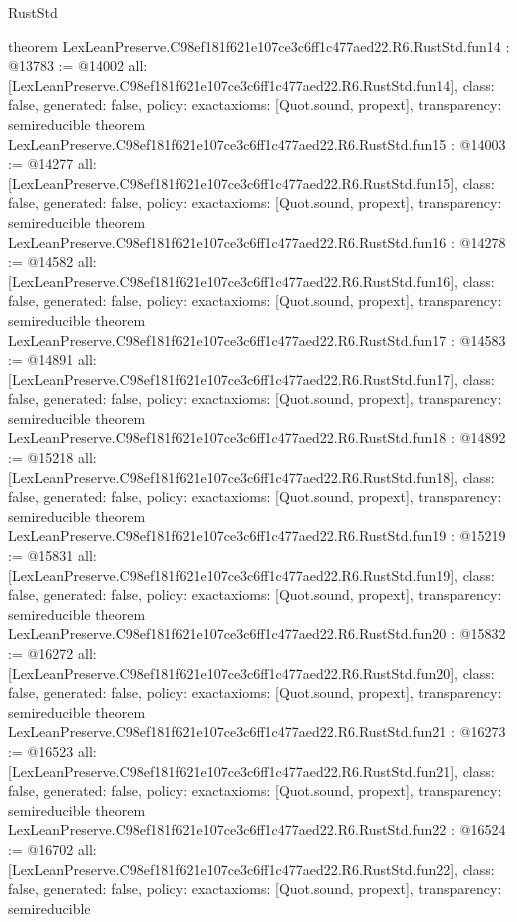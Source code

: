\begin{lexlean}{RustStd}
\begin{coremodule}
{}
theorem LexLeanPreserve.C98ef181f621e107ce3c6ff1c477aed22.R6.RustStd.fun14 : @13783 := @14002 {
  all: [LexLeanPreserve.C98ef181f621e107ce3c6ff1c477aed22.R6.RustStd.fun14],
  class: false,
  generated: false,
  policy: exact{axioms: [Quot.sound, propext]},
  transparency: semireducible
}
theorem LexLeanPreserve.C98ef181f621e107ce3c6ff1c477aed22.R6.RustStd.fun15 : @14003 := @14277 {
  all: [LexLeanPreserve.C98ef181f621e107ce3c6ff1c477aed22.R6.RustStd.fun15],
  class: false,
  generated: false,
  policy: exact{axioms: [Quot.sound, propext]},
  transparency: semireducible
}
theorem LexLeanPreserve.C98ef181f621e107ce3c6ff1c477aed22.R6.RustStd.fun16 : @14278 := @14582 {
  all: [LexLeanPreserve.C98ef181f621e107ce3c6ff1c477aed22.R6.RustStd.fun16],
  class: false,
  generated: false,
  policy: exact{axioms: [Quot.sound, propext]},
  transparency: semireducible
}
theorem LexLeanPreserve.C98ef181f621e107ce3c6ff1c477aed22.R6.RustStd.fun17 : @14583 := @14891 {
  all: [LexLeanPreserve.C98ef181f621e107ce3c6ff1c477aed22.R6.RustStd.fun17],
  class: false,
  generated: false,
  policy: exact{axioms: [Quot.sound, propext]},
  transparency: semireducible
}
theorem LexLeanPreserve.C98ef181f621e107ce3c6ff1c477aed22.R6.RustStd.fun18 : @14892 := @15218 {
  all: [LexLeanPreserve.C98ef181f621e107ce3c6ff1c477aed22.R6.RustStd.fun18],
  class: false,
  generated: false,
  policy: exact{axioms: [Quot.sound, propext]},
  transparency: semireducible
}
theorem LexLeanPreserve.C98ef181f621e107ce3c6ff1c477aed22.R6.RustStd.fun19 : @15219 := @15831 {
  all: [LexLeanPreserve.C98ef181f621e107ce3c6ff1c477aed22.R6.RustStd.fun19],
  class: false,
  generated: false,
  policy: exact{axioms: [Quot.sound, propext]},
  transparency: semireducible
}
theorem LexLeanPreserve.C98ef181f621e107ce3c6ff1c477aed22.R6.RustStd.fun20 : @15832 := @16272 {
  all: [LexLeanPreserve.C98ef181f621e107ce3c6ff1c477aed22.R6.RustStd.fun20],
  class: false,
  generated: false,
  policy: exact{axioms: [Quot.sound, propext]},
  transparency: semireducible
}
theorem LexLeanPreserve.C98ef181f621e107ce3c6ff1c477aed22.R6.RustStd.fun21 : @16273 := @16523 {
  all: [LexLeanPreserve.C98ef181f621e107ce3c6ff1c477aed22.R6.RustStd.fun21],
  class: false,
  generated: false,
  policy: exact{axioms: [Quot.sound, propext]},
  transparency: semireducible
}
theorem LexLeanPreserve.C98ef181f621e107ce3c6ff1c477aed22.R6.RustStd.fun22 : @16524 := @16702 {
  all: [LexLeanPreserve.C98ef181f621e107ce3c6ff1c477aed22.R6.RustStd.fun22],
  class: false,
  generated: false,
  policy: exact{axioms: [Quot.sound, propext]},
  transparency: semireducible
}
\end{coremodule}
\end{lexlean}
